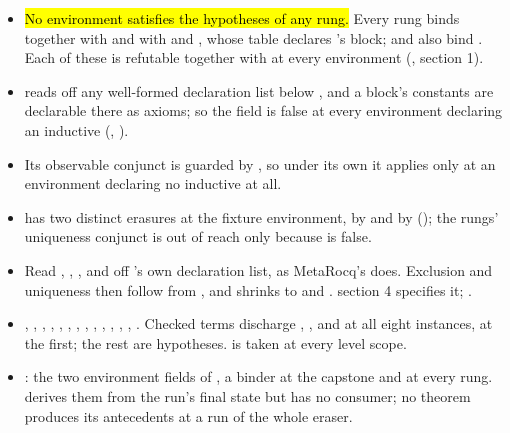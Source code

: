 \begin{itemize}
\item {} \stOpen{} \hl{No environment satisfies the hypotheses of any rung.} Every rung
binds  together with  and with
 and , whose table declares 's block;  and
 also bind . Each of these is refutable together with 
at every environment (, section 1).
\item {}  reads  off any
well-formed declaration list below , and a block's constants are declarable there as
axioms; so the field is false at every environment declaring an inductive
(, ).
\item {} Its observable conjunct is guarded by , so under
its own  it applies only at an environment declaring no inductive at all.
\item {}  has two distinct erasures at the fixture
environment, by  and by  (); the
rungs' uniqueness conjunct is out of reach only because  is false.
\item {} Read , , ,
 and  off 's own declaration list, as MetaRocq's
 does. Exclusion and uniqueness then follow from ,
and  shrinks to  and .
 section 4 specifies it; \stOpen{}.
\item {} , , , , , ,
, , , , , , ,
. Checked terms discharge , ,  and  at all
eight instances,  at the first; the rest are hypotheses.  is taken at every level
scope.
\item {} \stAssumed{}: the two environment fields of , a binder
at the capstone and at every rung.  derives them from the run's
final state but has no consumer; no theorem produces its antecedents at a run of the whole eraser.

\end{itemize}
